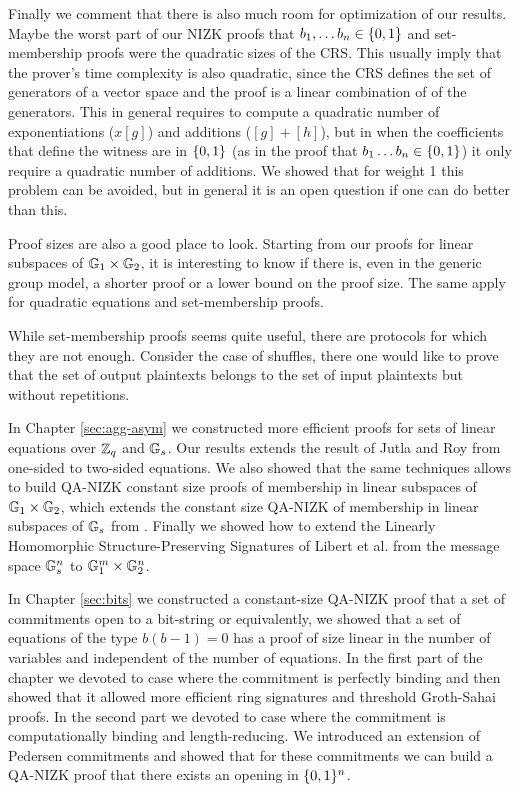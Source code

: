 Finally we comment that there is also much room for optimization of our results. Maybe the worst part of our NIZK proofs that $b_1,\ldots b_n\in\{0,1\}$ and set-membership proofs were the quadratic sizes of the CRS. This usually imply that the prover's time complexity is also quadratic, since the CRS defines the set of generators of a vector space and the proof is a linear combination of of the generators. This in general requires to compute a quadratic number of exponentiations ($x[g]$)  and additions ($[g]+[h]$), but in when the coefficients that define the witness are in $\{0,1\}$ (as in the proof that $b_1\ldots b_n\in\{0,1\}$) it only require a quadratic number of additions. We showed that for weight 1 this problem can be avoided, but in general it is an open question if one can do better than this.

Proof sizes are also a good place to look. Starting from our proofs for linear subspaces of $\mathbb{G}_1\times\mathbb{G}_2$, it is interesting to know if there is, even in the generic group model, a shorter proof or a lower bound on the proof size. The same apply for quadratic equations and set-membership proofs.

\iffalse
While set-membership proofs seems quite useful, there are protocols for which they are not enough. Consider the case of shuffles, there one would like to prove that the set of output plaintexts belongs to the set of input plaintexts but without repetitions. 


In Chapter \ref{sec:agg-asym} we constructed more efficient proofs for sets of linear equations over $\mathbb{Z}_q$ and $\mathbb{G}_s$. Our results extends the result of Jutla and Roy \cite{C:JutRoy14} from one-sided to two-sided equations. We also showed that the same techniques allows to build QA-NIZK constant size proofs of membership in linear subspaces of $\mathbb{G}_1\times\mathbb{G}_2$, which extends the constant size QA-NIZK of membership in linear subspaces of $\mathbb{G}_s$ from \cite{EC:LPJY14,C:JutRoy14,EC:KilWee15,EC:AbdBenPoi15}. Finally we showed how to extend the Linearly Homomorphic Structure-Preserving Signatures of Libert et al. \cite{EC:LPJY14} from the message space $\mathbb{G}_s^n$ to $\mathbb{G}_1^m\times\mathbb{G}_2^n$.

In Chapter \ref{sec:bits} we constructed a constant-size QA-NIZK proof that a set of commitments open to a bit-string or equivalently, we showed that a set of equations of the type $b(b-1)=0$ has a proof of size linear in the number of variables and independent of the number of equations. In the first part of the chapter we devoted to case where the commitment is perfectly binding and then showed that it allowed more efficient ring signatures and threshold Groth-Sahai proofs. In the second part we devoted to case where the commitment is computationally binding and length-reducing. We introduced an extension of Pedersen commitments and showed that for these commitments we can build a QA-NIZK proof that there exists an opening in $\{0,1\}^n$.

